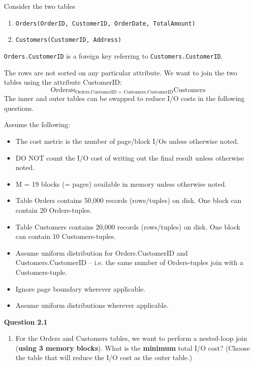   \begin{example}
    \label{ex:join-operations}
    Consider the two tables
    \begin{enumerate}
      \item \texttt{Orders(OrderID, CustomerID, OrderDate, TotalAmount)} 
      \item \texttt{Customers(CustomerID, Address)}
    \end{enumerate}
    \texttt{Orders.CustomerID} is a foreign key referring to \texttt{Customers.CustomerID}.

    The rows are not sorted on any particular attribute. We want to join the two tables using the attribute CustomerID:
    \begin{equation}
      \text{Orders} \bowtie_{\text{Orders.CustomerID = Customers.CustomerID}} \text{Customers}
    \end{equation}
    The inner and outer tables can be swapped to reduce I/O costs in the following questions.

    Assume the following:
    \begin{itemize}
      \item The cost metric is the number of page/block I/Os unless otherwise noted.
      \item DO NOT count the I/O cost of writing out the final result unless otherwise noted.
      \item M = 19 blocks (= pages) available in memory unless otherwise noted.
      \item Table Orders contains 50,000 records (rows/tuples) on disk. One block can contain 20 Orders-tuples.
      \item Table Customers contains 20,000 records (rows/tuples) on disk. One block can contain 10 Customers-tuples.
      \item Assume uniform distribution for Orders.CustomerID and Customers.CustomerID -- i.e. the same number of Orders-tuples join with a Customers-tuple.
      \item Ignore page boundary wherever applicable.
      \item Assume uniform distributions wherever applicable.
    \end{itemize}

    \vspace{1em}
    \noindent\textbf{Question 2.1}
    \begin{enumerate}[label=(\alph*)]
      \item For the Orders and Customers tables, we want to perform a nested-loop join (\textbf{using 3 memory blocks}). What is the \textbf{minimum} total I/O cost? (Choose the table that will reduce the I/O cost as the outer table.)
      

\end{enumerate}
\end{example}
